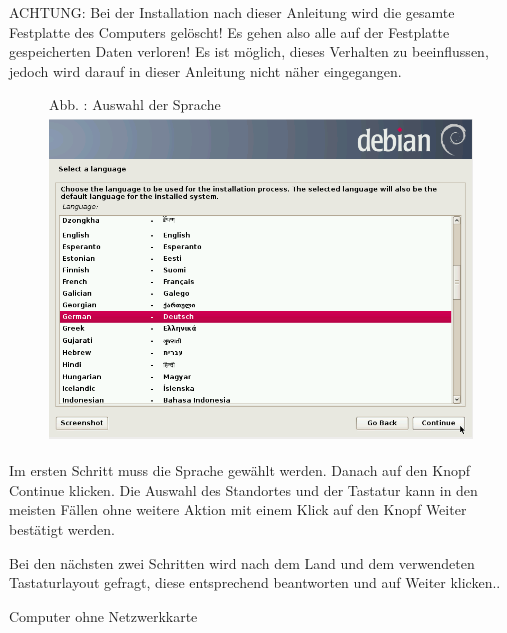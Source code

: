 \documentclass[a4paper,12pt,twoside]{article}
\newcounter{Abb}
\renewcommand\theAbb{\arabic{Abb}}
\begin{document}
\bigskip

ACHTUNG: Bei der Installation nach dieser Anleitung wird die gesamte
Festplatte des Computers gelöscht! Es gehen also alle auf der
Festplatte gespeicherten Daten verloren! Es ist möglich, dieses
Verhalten zu beeinflussen, jedoch wird darauf in dieser Anleitung nicht
näher eingegangen.


\bigskip


\bigskip



\begin{figure}
\centering
\begin{minipage}{11.494cm}
Abb. \stepcounter{Abb}{\theAbb}: Auswahl der Sprache
\includegraphics[width=11.494cm,height=8.67cm]{efaLivede-img/efaLivede-img4.png}\end{minipage}
\end{figure}
Im ersten Schritt muss die Sprache gewählt werden. Danach auf den Knopf
{\textquotedbl}Continue{\textquotedbl} klicken. Die Auswahl des
Standortes und der Tastatur kann in den meisten Fällen ohne weitere
Aktion mit einem Klick auf den Knopf
{\textquotedbl}Weiter{\textquotedbl} bestätigt werden.

Bei den nächsten zwei Schritten wird nach dem Land und dem verwendeten
Tastaturlayout gefragt, diese entsprechend beantworten und auf
{\textquotedbl}Weiter{\textquotedbl} klicken..


\bigskip

Computer ohne Netzwerkkarte


\bigskip
\end{document}
